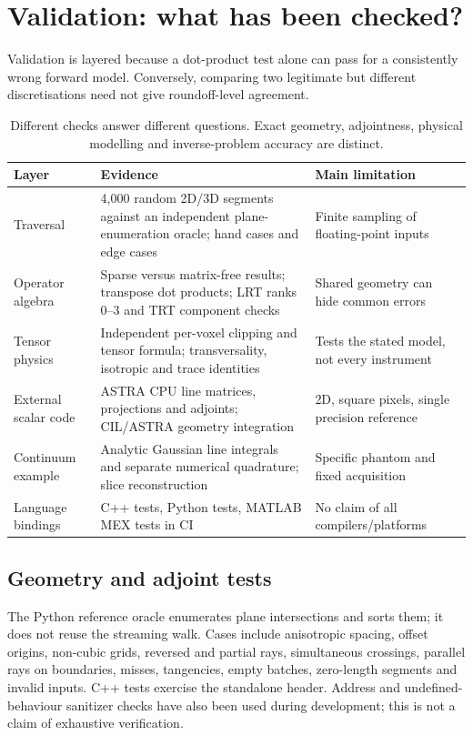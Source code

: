 \documentclass[11pt,a4paper]{article}
\begin{document}
\section{Validation: what has been checked?}
\label{sec:validation}
Validation is layered because a dot-product test alone can pass for a
consistently wrong forward model. Conversely, comparing two legitimate
but different discretisations need not give roundoff-level agreement.
\begin{table}[htbp]
\centering\small
\begin{tabularx}{\linewidth}{@{}p{.22\linewidth}YY@{}}
\toprule
Layer & Evidence & Main limitation \\
\midrule
Traversal & 4,000 random 2D/3D segments against an independent plane-enumeration
oracle; hand cases and edge cases & Finite sampling of floating-point inputs \\
Operator algebra & Sparse versus matrix-free results; transpose dot products;
LRT ranks 0--3 and TRT component checks & Shared geometry can hide common errors \\
Tensor physics & Independent per-voxel clipping and tensor formula;
transversality, isotropic and trace identities & Tests the stated model, not every instrument \\
External scalar code & ASTRA CPU line matrices, projections and adjoints;
CIL/ASTRA geometry integration & 2D, square pixels, single precision reference \\
Continuum example & Analytic Gaussian line integrals and separate numerical
quadrature; slice reconstruction & Specific phantom and fixed acquisition \\
Language bindings & C++ tests, Python tests, MATLAB MEX tests in CI & No claim of all compilers/platforms \\
\bottomrule
\end{tabularx}
\caption{Different checks answer different questions. Exact geometry,
adjointness, physical modelling and inverse-problem accuracy are distinct.}
\end{table}

\subsection{Geometry and adjoint tests}
The Python reference oracle enumerates plane intersections and sorts them;
it does not reuse the streaming walk. Cases include anisotropic spacing,
offset origins, non-cubic grids, reversed and partial rays, simultaneous
crossings, parallel rays on boundaries, misses, tangencies, empty batches,
zero-length segments and invalid inputs. C++ tests exercise the standalone
header. Address and undefined-behaviour sanitizer checks have also been
used during development; this is not a claim of exhaustive verification.
\end{document}
